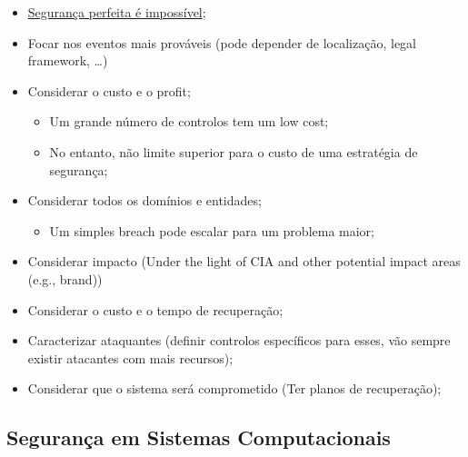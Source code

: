 \documentclass{article}
\begin{document}
\begin{flushleft}
  \begin{itemize}
    \item \uline{Segurança perfeita é impossível};
    \item Focar nos eventos mais prováveis (pode depender de localização, legal framework, \dots)
    \item Considerar o custo e o profit;
    \begin{itemize}
      \item Um grande número de controlos tem um low cost;
      \item No entanto, não limite superior para o custo de uma estratégia de segurança;
    \end{itemize}
    \item Considerar todos os domínios e entidades;
    \begin{itemize}
      \item Um simples breach pode escalar para um problema maior;
    \end{itemize}
    \item Considerar impacto (Under the light of CIA and other potential impact areas (e.g., brand))
    \item Considerar o custo e o tempo de recuperação;
    \item Caracterizar ataquantes (definir controlos específicos para esses, vão
    sempre existir atacantes com mais recursos);
    \item Considerar que o sistema será comprometido (Ter planos de recuperação);
  \end{itemize}
\end{flushleft}

\subsection{Segurança em Sistemas Computacionais}
\end{document}
